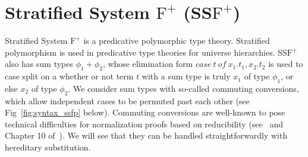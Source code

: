 \newcommand{\ccon}[4]{\mbox{case}\ #1\ \text{of}\ #2\text{.}#3\text{,}#2\text{.}#4}
\newcommand{\rcase}[5]{\mbox{rcase}_{#1}\ #2\ #3\ #4\ #5}
\newcommand{\F}[0]{\mbox{F}^{=}}
\newcommand{\Fp}[0]{\mbox{F}^{+}}
\newcommand{\STLCeq}[0]{\textnormal{STLC}^=}
\newcommand{\A}[0]{\mbox{\textbf{A}}}
\newcommand{\bredto}[0]{\rightsquigarrow_\beta}
\newcommand{\hlmn}[2]{
  \marginpar{
    \small
    {\color{blue}{
        \tiny #2
    }}}
    {\color{red}{
        #1
    }}
}

\section{Stratified System $\Fp$ (SS$\Fp$)}
\label{sec:stratified_system_f_with_sum_types}
Stratified System $\Fp$ is a predicative polymorphic type theory.
Stratified polymorphism is used in predicative type theories for
universe hierarchies.  SS$\Fp$ also has sum types $\phi_1 + \phi_2$,
whose elimination form
$\textit{case}\ t\ \textit{of}\ x_1.t_1,x_2.t_2$ is used to case split
on a whether or not term $t$ with a sum type is truly $x_1$ of type
$\phi_1$, or else $x_2$ of type $\phi_2$.  We consider sum types with
so-called commuting conversions, which allow independent cases to be
permuted past each other (see Fig~\ref{fig:syntax_ssfp}
below).  Commuting conversions are well-known to pose technical
difficulties for normalization proofs based on reducibility
(see~\cite{tatsuta+05} and Chapter 10 of~\cite{Girard:1989}).  We will
see that they can be handled straightforwardly with hereditary
substitution.

